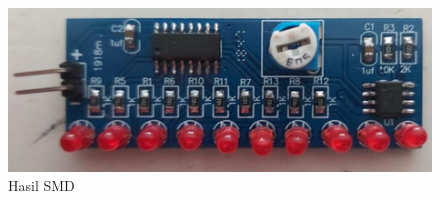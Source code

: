 \begin{figure}[H]
    \centering
    \includegraphics[width=0.8\linewidth]{P1/img/HasilSMD.png}
    \caption{Hasil SMD}
    \label{fig:HasilSMD}
\end{figure}